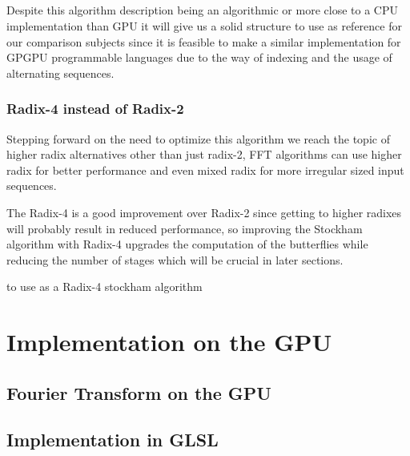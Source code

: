 \documentclass[
  oneside,
  11pt, a4paper,
  footinclude=true,
  headinclude=true,
  cleardoublepage=empty
]{scrbook}
\begin{document}
\paragraph{}
Despite this algorithm description being an algorithmic or more close to a CPU implementation than GPU it will give us a solid structure to use as reference for our comparison subjects since it is feasible to make a similar implementation for GPGPU programmable languages due to the way of indexing and the usage of alternating sequences.

\subsection{Radix-4 instead of Radix-2}

Stepping forward on the need to optimize this algorithm we reach the topic of higher radix alternatives other than just radix-2, FFT algorithms can use higher radix for better performance and even mixed radix \cite{singleton1969algorithm} for more irregular sized input sequences.

The Radix-4 is a good improvement over Radix-2 since getting to higher radixes will probably result in reduced performance, so improving the Stockham algorithm with Radix-4 upgrades the computation of the butterflies while reducing the number of stages which will be crucial in later sections.

to use as a Radix-4 stockham algorithm
\cite{marti2009radix}




\chapter{Implementation on the GPU}
\section{Fourier Transform on the GPU}
\section{Implementation in GLSL}

\end{document}
